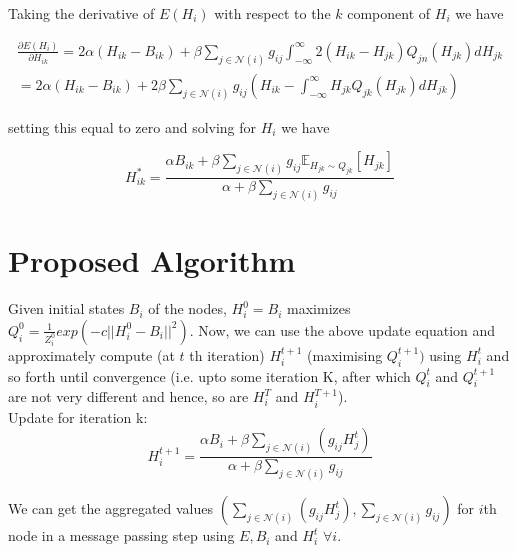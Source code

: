 Taking the derivative of $E(H_i)$ with respect to the $k$ component of $H_i$ we have

\begin{multline}
\frac{\partial E(H_i)} {\partial H_{ik}} = 2\alpha (H_{ik} - B_{ik}) + \beta \sum_{j \in \mathcal{N}(i)} g_{ij} \int_{-\infty}^{\infty} 2 (H_{ik} - H_{jk})  Q_{jn}(H_{jk}) d H_{jk} \\
= 2\alpha (H_{ik} - B_{ik}) + 2\beta \sum_{j \in \mathcal{N}(i)} g_{ij}  (H_{ik} - \int_{-\infty}^{\infty} H_{jk} Q_{jk}(H_{jk})d H_{jk})
\end{multline}

setting this equal to zero and solving for $H_i$ we have

\begin{equation}
H_{ik}^* = \frac{\alpha B_{ik} + \beta  \sum\limits_{j \in \mathcal{N}(i)} g_{ij} \mathbb{E}_{ H_{jk} \sim Q_{jk} } [H_{jk}]} {\alpha +  \beta  \sum \limits_{j \in \mathcal{N}(i)} g_{ij} }
\end{equation}
\section*{Proposed Algorithm}
Given initial states $B_i$ of the nodes, $H_i^0 = B_i$ maximizes $Q_i^0 = \frac{1}{Z_i^0}exp(-c||H_i^0 - B_i||^2)$. Now, we can use the above update equation and approximately     compute (at $t$ th iteration) $H_i^{t+1}$ (maximising $Q_i^{t+1})$ using $H_i^t$ and so forth until convergence (i.e. upto some iteration K, after which $Q_i^t$ and $Q_i^{t+1}$ are not very different and hence, so are $H_i^{T}$ and $H_i^{T+1}$).
\\
Update for iteration k:
\begin{equation}
 H_{i}^{t+1} = \frac{\alpha B_{i} + \beta  \sum\limits_{j \in \mathcal{N}(i)} (g_{ij} H_j^t)} {\alpha +  \beta  \sum \limits_{j \in \mathcal{N}(i)} g_{ij} }
\end{equation}

We can get the aggregated values $(\sum \limits_{j \in \mathcal{N}(i)} (g_{ij} H_j^t),\sum \limits_{j \in \mathcal{N}(i)} g_{ij})$ for $i$th node in a message passing step using $E, B_i$ and $H_i^t$ $\forall i$.
\newpage
